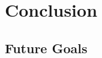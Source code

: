 \documentclass[a4paper]{l3proj}
\begin{document}
\chapter{Conclusion}
\label{conclusion}


\section{Future Goals}
\label{futureGoals}


{}

\end{document}
